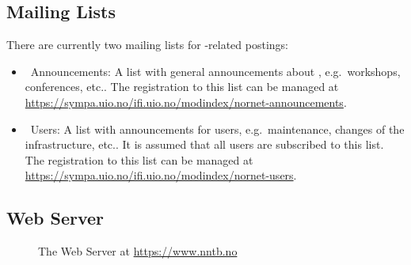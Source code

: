 \subsection{Mailing Lists}

There are currently two mailing lists for -related postings:

\begin{itemize}
 \item {}~Announcements:
 A list with general announcements about , e.g.\ workshops, conferences, etc..
 The registration to this list can be managed at \url{https://sympa.uio.no/ifi.uio.no/modindex/nornet-announcements}.

 \item {}~Users:
 A list with announcements for  users, e.g.\ maintenance, changes of the infrastructure, etc.. It is assumed that all  users are subscribed to this list.
 The registration to this list can be managed at \url{https://sympa.uio.no/ifi.uio.no/modindex/nornet-users}.
\end{itemize}


\subsection{Web Server}

\begin{figure*}
\begin{center}
\end{center}
\caption{The  Web Server at \url{https://www.nntb.no}}
\label{cap:WebServer}
\end{figure*}

